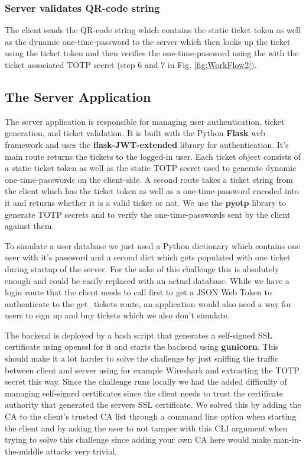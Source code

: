 \subsubsection{Server validates QR-code string}
The client sends the QR-code string which contains the static ticket token as well as the dynamic one-time-password to the server which then looks up the ticket using the ticket token and then verifies the one-time-password using the with the ticket associated TOTP secret (step 6 and 7 in Fig. \ref{fig:WorkFlow2}).


\subsection{The Server Application}
The server application is responsible for managing user authentication, ticket generation, and ticket validation. It is built with the Python \textbf{Flask} web framework and uses the \textbf{flask-JWT-extended} library for authentication. It's main route returns the tickets to the logged-in user. Each ticket object consists of a static ticket token as well as the static TOTP secret used to generate dynamic one-time-passwords on the client-side. A second route takes a ticket string from the client which has the ticket token as well as a one-time-password encoded into it and returns whether it is a valid ticket or not. We use the \textbf{pyotp} library to generate TOTP secrets and to verify the one-time-passwords sent by the client against them.

To simulate a user database we just used a Python dictionary which contains one user with it's password and a second dict which gets populated with one ticket during startup of the server. For the sake of this challenge this is absolutely enough and could be easily replaced with an actual database. While we have a login route that the client needs to call first to get a JSON Web Token to authenticate to the get\_tickets route, an application would also need a way for users to sign up and buy tickets which we also don't simulate.

The backend is deployed by a bash script that generates a self-signed SSL certificate using openssl for it and starts the backend using \textbf{gunicorn}. This should make it a lot harder to solve the challenge by just sniffing the traffic between client and server using for example Wireshark and extracting the TOTP secret this way. Since the challenge runs locally we had the added difficulty of managing self-signed certificates since the client needs to trust the certificate authority that generated the servers SSL certificate. We solved this by adding the CA to the client's trusted CA list through a command line option when starting the client and by asking the user to not tamper with this CLI argument when trying to solve this challenge since adding your own CA here would make man-in-the-middle attacks very trivial.


